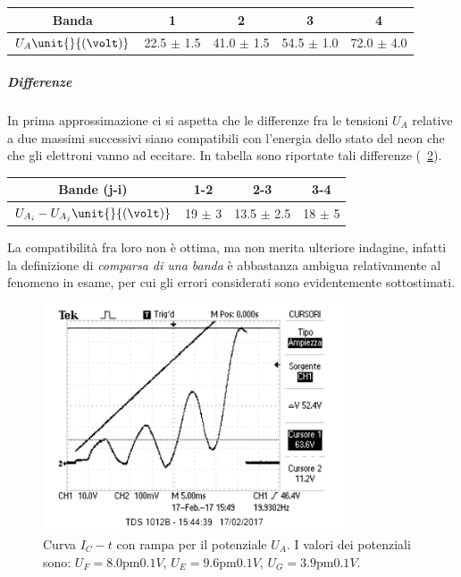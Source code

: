 \documentclass[10pt,a4paper]{article}
\begin{document}
\begin{table}[h!]
\centering
\begin{tabular}{c|c|c|c|c}
\hline
Banda &1&2&3&4\\
\hline 
$U_{A} \unit{}{(\volt)}$ & 22.5 $\pm$ 1.5 & 41.0 $\pm$ 1.5 & 54.5 $\pm$ 1.0 & 72.0 $\pm$ 4.0  \\ 
\hline
\end{tabular}
\label{tab:massimi}
\end{table}


\subparagraph{Differenze} In prima approssimazione ci si aspetta che le differenze fra le tensioni $U_A$ relative a due massimi successivi siano compatibili con l'energia dello stato del neon che che gli elettroni vanno ad eccitare. In tabella sono riportate tali differenze (\tablename{~\ref{tab:differenze}}).

\begin{table}[h!]
	\centering
	\begin{tabular}{c|c|c|c}
		\hline
		Bande (j-i) &1-2&2-3&3-4\\
		\hline 
		$U_{A_i}-U_{A_j} \unit{}{(\volt)}$ & 19 $\pm$ 3  & 13.5 $\pm$ 2.5 & 18 $\pm$ 5\\ 
		\hline
	\end{tabular}
	\label{tab:differenze}
\end{table}

La compatibilità fra loro non è ottima, ma non merita ulteriore indagine, infatti la definizione di \emph{comparsa di una banda} è abbastanza ambigua relativamente al fenomeno in esame, per cui gli errori considerati sono evidentemente sottostimati.

\begin{figure}[h!]
	\centering
	\includegraphics[width=0.80\textwidth]{../oscilloscopio/CorrenteAnodicaTempo1.png}
	\caption{Curva $I_{C} - t$ con rampa per il potenziale $U_{A}$. I valori dei potenziali sono: $U_{F}=\unit{8.0 \pm 0.1}{V}$, $U_{E}=\unit{9.6 \pm 0.1}{V}$, $U_{G}=\unit{3.9 \pm 0.1}{V}$.}
	\label{andamento}
\end{figure}
\end{document}
